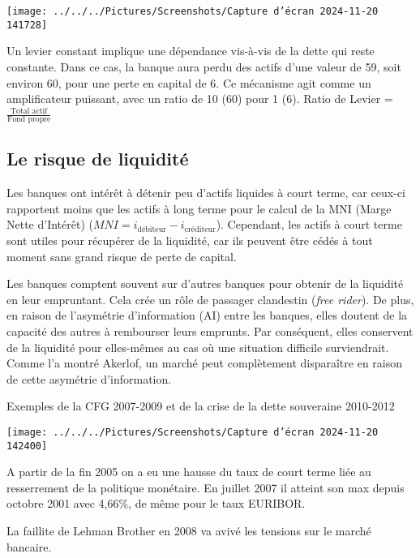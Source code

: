 \documentclass[a4paper, 12pt]{report}
\begin{document}
\begin{center}
	\texttt{[image: ../../../Pictures/Screenshots/Capture d'écran 2024-11-20 141728]}
\end{center}

Un levier constant implique une dépendance vis-à-vis de la dette qui reste constante. Dans ce cas, la banque aura perdu des actifs d'une valeur de 59, soit environ 60, pour une perte en capital de 6. Ce mécanisme agit comme un amplificateur puissant, avec un ratio de 10 (60) pour 1 (6). Ratio de Levier = \( \frac{\text{Total actif}}{\text{Fond propre}} \)

\subsection{Le risque de liquidité}

Les banques ont intérêt à détenir peu d'actifs liquides à court terme, car ceux-ci rapportent moins que les actifs à long terme pour le calcul de la MNI (Marge Nette d'Intérêt) (\( MNI = i_{\text{débiteur}}-i_{\text{créditeur}}  \)). Cependant, les actifs à court terme sont utiles pour récupérer de la liquidité, car ils peuvent être cédés à tout moment sans grand risque de perte de capital. 

Les banques comptent souvent sur d'autres banques pour obtenir de la liquidité en leur empruntant. Cela crée un rôle de passager clandestin (\textit{free rider}). De plus, en raison de l'asymétrie d'information (AI) entre les banques, elles doutent de la capacité des autres à rembourser leurs emprunts. Par conséquent, elles conservent de la liquidité pour elles-mêmes au cas où une situation difficile surviendrait. Comme l'a montré Akerlof, un marché peut complètement disparaître en raison de cette asymétrie d'information.

Exemples de la CFG 2007-2009 et de la crise de la dette souveraine 2010-2012

\begin{center}
	\texttt{[image: ../../../Pictures/Screenshots/Capture d'écran 2024-11-20 142400]}
\end{center}

A partir de la fin 2005 on a eu une hausse du taux de court terme liée au resserrement de la politique monétaire. En juillet 2007 il atteint son max depuis octobre 2001 avec 4,66\%, de même pour le taux EURIBOR.

La faillite de Lehman Brother en 2008 va avivé les tensions sur le marché bancaire. 
\end{document}
